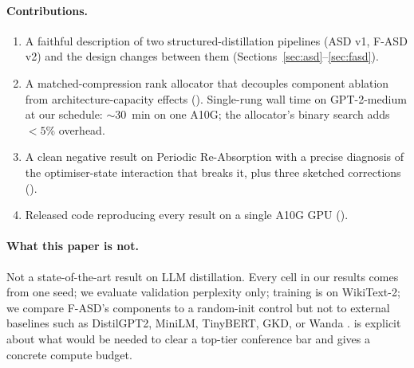 \documentclass[11pt]{article}
\newcommand{\fasd}{\textsc{F-ASD}}
\newcommand{\asd}{\textsc{ASD}}
\begin{document}
\paragraph{Contributions.}
\begin{enumerate}[leftmargin=*,itemsep=2pt]
  \item A faithful description of two structured-distillation pipelines
        (\asd{} v1, \fasd{} v2) and the design changes between them
        (Sections~\ref{sec:asd}--\ref{sec:fasd}).
  \item A matched-compression rank allocator that decouples
        component ablation from architecture-capacity effects
        (). Single-rung wall time on GPT-2-medium
        at our schedule: $\sim$$30$~min on one A10G; the allocator's
        binary search adds $<5\%$ overhead.
  \item A clean negative result on Periodic Re-Absorption with a precise
        diagnosis of the optimiser-state interaction that breaks it,
        plus three sketched corrections ().
  \item Released code reproducing every result on a single A10G GPU
        ().
\end{enumerate}

\paragraph{What this paper is not.}
Not a state-of-the-art result on LLM distillation. Every cell in our
results comes from one seed; we evaluate validation perplexity only;
training is on WikiText-2; we compare \fasd{}'s components to a random-init
control but not to external baselines such as DistilGPT2, MiniLM,
TinyBERT, GKD, or Wanda \citep{Sanh2019DistilBERT,Wang2020MiniLM,Jiao2020TinyBERT,Agarwal2024GKD,Sun2023Wanda}.
 is explicit about what would be needed to clear a
top-tier conference bar and gives a concrete compute budget.
\end{document}
